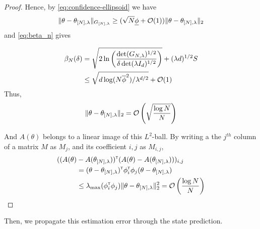 \begin{subappendices}
\begin{proof}
		Hence, by \eqref{eq:confidence-ellipsoid} we have 
		\begin{align*}
		\|\theta - \theta_{[N],\lambda}\|_{G_{[N],\lambda}} \geq (\sqrt{N}\underline{\phi} + \mathcal{O}(1))\|\theta - \theta_{[N],\lambda}\|_{2}
		\end{align*}
		and \eqref{eq:beta_n} gives
		
		\begin{align*}
		\beta_N(\delta) &= \sqrt{2\ln \left(\frac{\det(G_{N,\lambda})^{1/2}}{\delta\det(\lambda I_d)^{1/2}}\right)}
		+ (\lambda d)^{1/2}S\\
		&\leq \sqrt{d\log (N\overline{\phi}^2) / \lambda^{d/2}} + \mathcal{O}(1)
		\end{align*}
		Thus,
		\[\|\theta - \theta_{[N],\lambda}\|_{2} = \mathcal{O}\left( \sqrt{\frac{\log N}{N}} \right) \]
		
		And $A(\theta)$ belongs to a linear image of this $L^2$-ball. By writing a the $j^{th}$ column of a matrix $M$ as $M_j$, and its coefficient $i,j$ as $M_{i,j}$,
		\begin{align*}
		((A(\theta)&-A(\theta_{[N],\lambda}))^{\mathsf{\scriptscriptstyle T}} (A(\theta) - A(\theta_{[N],\lambda})))_{i,j}\\
		&= (\theta-\theta_{[N],\lambda})^{\mathsf{\scriptscriptstyle T}}\phi_{i}^{\mathsf{\scriptscriptstyle T}}\phi_j(\theta-\theta_{[N],\lambda}) \\
		&\leq \lambda_{\max}(\phi_{i}^{\mathsf{\scriptscriptstyle T}}\phi_j) \|\theta - \theta_{[N],\lambda}\|_{2}^2 = \mathcal{O}\left( {\frac{\log N}{N}} \right) 
		\end{align*}
		
	\end{proof}
	
	Then, we propagate this estimation error through the state prediction.
	

\end{subappendices}

